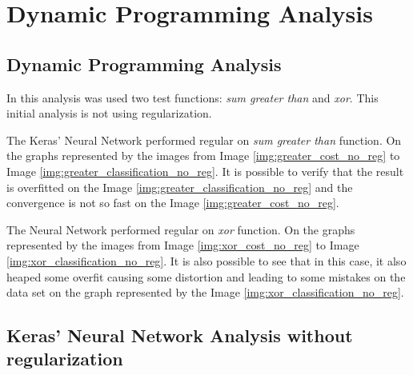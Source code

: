 \documentclass[journal]{IEEEtran}
\begin{document}






\section{Dynamic Programming Analysis}

\subsection{Dynamic Programming Analysis }

In this analysis was used two test functions: \textit{sum greater than} and \textit{xor}. This initial analysis is not using regularization.

The Keras' Neural Network performed regular on \textit{sum greater than} function. On the graphs represented by the images from Image \ref{img:greater_cost_no_reg} to Image \ref{img:greater_classification_no_reg}. It is possible to verify that the result is overfitted on the Image \ref{img:greater_classification_no_reg} and the convergence is not so fast on the Image \ref{img:greater_cost_no_reg}.


The Neural Network performed regular on \textit{xor} function. On the graphs represented by the images from Image \ref{img:xor_cost_no_reg} to Image \ref{img:xor_classification_no_reg}. It is also possible to see that in this case, it also heaped some overfit causing some distortion and leading to some mistakes on the data set on the graph represented by the Image \ref{img:xor_classification_no_reg}.



\subsection{Keras' Neural Network Analysis without regularization}
\end{document}
